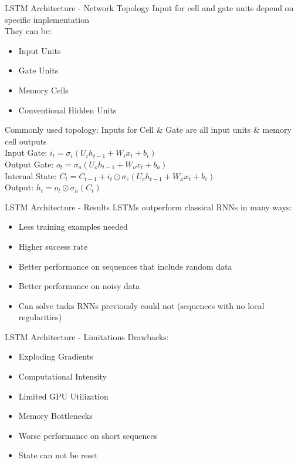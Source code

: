 \documentclass[10pt, aspectratio=169]{beamer}
\begin{document}
\begin{frame}[t]{LSTM Architecture - Network Topology}
Input for cell and gate units depend on specific implementation \pause\\
They can be:\pause
\begin{itemize}
    \item Input Units \pause
    \item Gate Units \pause
    \item Memory Cells \pause
    \item Conventional Hidden Units \pause
\end{itemize}
Commonly used topology: Inputs for Cell & Gate are all input units & memory cell outputs \pause\\
Input Gate:  \begin{math}i_t=\sigma_i\left(U_{i}h_{t-1}+W_{i} x_t + b_i\right)\end{math}\pause\\
Output Gate: \begin{math}o_t=\sigma_o\left(U_{o}h_{t-1}+W_{o}x_t + b_o\right)\end{math}\pause\\
Internal State: \begin{math}C_t=C_{t-1}+i_t\odot\sigma_c\left(U_{c}h_{t-1}+W_{x}x_t + b_c\right)\end{math}\pause\\
Output: \begin{math}h_t=o_t\odot\sigma_h\left(C_t\right)\end{math}
\end{frame}

\begin{frame}[t]{LSTM Architecture - Results}
LSTMs outperform classical RNNs in many ways:\pause
\begin{itemize}
    \item Less training examples needed\pause
    \item Higher success rate \pause
    \item Better performance on sequences that include random data \pause
    \item Better performance on noisy data \pause
    \item Can solve tasks RNNs previously could not (sequences with no local regularities)
\end{itemize}

\end{frame}

\begin{frame}[t]{LSTM Architecture - Limitations}
Drawbacks: \pause
\begin{itemize}
    \item Exploding Gradients \pause
    \item Computational Intensity \pause
    \item Limited GPU Utilization \pause
    \item Memory Bottlenecks \pause
    \item Worse performance on short sequences \pause
    \item State can not be reset
\end{itemize}
\end{frame}
\end{document}

